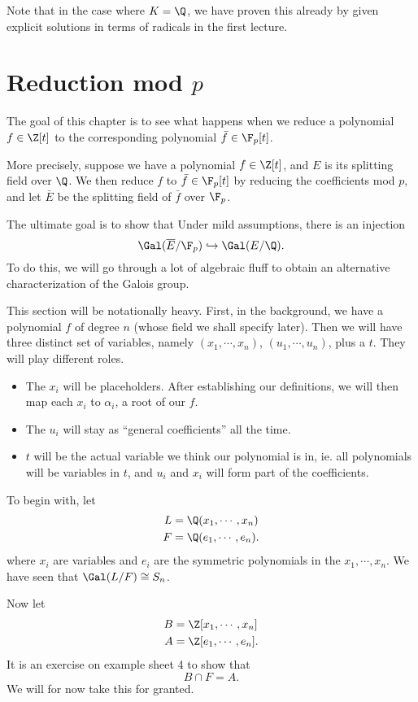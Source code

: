 \documentclass[a4paper]{article}
\begin{document}
Note that in the case where $K = \Q$, we have proven this already by given explicit solutions in terms of radicals in the first lecture.

\section{Reduction mod \texorpdfstring{$p$}{p}}
The goal of this chapter is to see what happens when we reduce a polynomial $f \in \Z[t]$ to the corresponding polynomial $\bar{f} \in \F_p[t]$.

More precisely, suppose we have a polynomial $f \in \Z[t]$, and $E$ is its splitting field over $\Q$. We then reduce $f$ to $\bar{f} \in \F_p[t]$ by reducing the coefficients mod $p$, and let $\bar{E}$ be the splitting field of $\bar{f}$ over $\F_p$.

The ultimate goal is to show that Under mild assumptions, there is an injection
\[
  \Gal(\overline{E}/\F_p) \hookrightarrow \Gal(E/\Q).
\]
To do this, we will go through a lot of algebraic fluff to obtain an alternative characterization of the Galois group.

This section will be notationally heavy. First, in the background, we have a polynomial $f$ of degree $n$ (whose field we shall specify later). Then we will have three distinct set of variables, namely $(x_1, \cdots, x_n)$, $(u_1, \cdots, u_n)$, plus a $t$. They will play different roles.
\begin{itemize}
  \item The $x_i$ will be placeholders. After establishing our definitions, we will then map each $x_i$ to $\alpha_i$, a root of our $f$.
  \item The $u_i$ will stay as ``general coefficients'' all the time.
  \item $t$ will be the actual variable we think our polynomial is in, ie. all polynomials will be variables in $t$, and $u_i$ and $x_i$ will form part of the coefficients.
\end{itemize}

To begin with, let
\begin{align*}
  L &= \Q(x_1, \cdots, x_n)\\
  F &= \Q(e_1, \cdots, e_n).
\end{align*}
where $x_i$ are variables and $e_i$ are the symmetric polynomials in the $x_1, \cdots, x_n$. We have seen that $\Gal(L/F) \cong S_n$.

Now let
\begin{align*}
  B &= \Z[x_1, \cdots, x_n]\\
  A &= \Z[e_1, \cdots, e_n].
\end{align*}
It is an exercise on example sheet 4 to show that
\[
  B\cap F = A.\tag{$*$}
\]
We will for now take this for granted.
\end{document}
